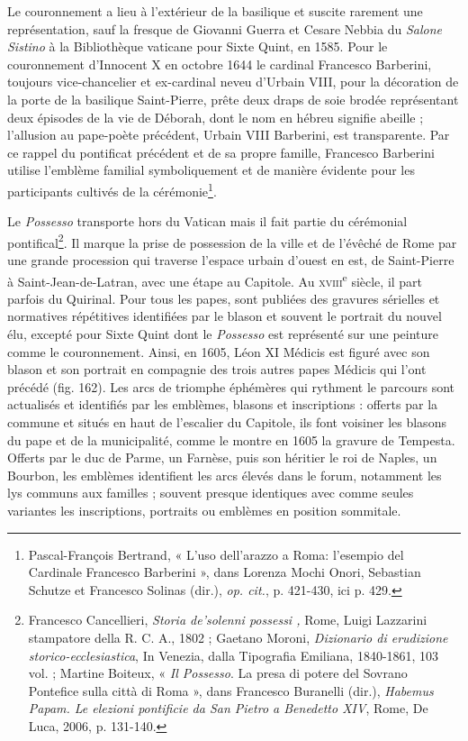 \documentclass[12pt,twoside,openany]{book}
\begin{document}
Le couronnement a lieu à l’extérieur de la basilique et suscite rarement une représentation, sauf la fresque de Giovanni Guerra et Cesare Nebbia du \textit{Salone Sistino} à la Bibliothèque vaticane pour Sixte Quint, en 1585. Pour le couronnement d’Innocent X en octobre 1644 le cardinal Francesco Barberini, toujours vice-chancelier et ex-cardinal neveu d’Urbain VIII, pour la décoration de la porte de la basilique Saint-Pierre, prête deux draps de soie brodée représentant deux épisodes de la vie de Déborah, dont le nom en hébreu signifie abeille ; l’allusion au pape-poète précédent, Urbain VIII Barberini, est transparente. Par ce rappel du pontificat précédent et de sa propre famille, Francesco Barberini utilise l’emblème familial symboliquement et de manière évidente pour les participants cultivés de la cérémonie\footnote{Pascal-François Bertrand, « L’uso dell’arazzo a Roma: l’esempio del Cardinale Francesco Barberini », dans Lorenza Mochi Onori, Sebastian Schutze et Francesco Solinas (dir.), \textit{op. cit.}, p. 421-430, ici p. 429.}.

Le \textit{Possesso} transporte hors du Vatican mais il fait partie du cérémonial pontifical\footnote{Francesco Cancellieri, \textit{Storia de'solenni possessi ,} Rome, Luigi Lazzarini stampatore della R. C. A., 1802 ; Gaetano Moroni, \textit{Dizionario di erudizione storico-ecclesiastica}, In Venezia, dalla Tipografia Emiliana, 1840-1861, 103 vol. ; Martine Boiteux, « \textit{Il Possesso}. La presa di potere del Sovrano Pontefice sulla città di Roma », dans Francesco Buranelli (dir.),\textit{ Habemus Papam. Le elezioni pontificie da San Pietro a Benedetto XIV}, Rome, De Luca, 2006, p. 131-140.}. Il marque la prise de possession de la ville et de l’évêché de Rome par une grande procession qui traverse l’espace urbain d’ouest en est, de Saint-Pierre à Saint-Jean-de-Latran, avec une étape au Capitole. Au \textsc{xviii}\textsuperscript{e} siècle, il part parfois du Quirinal. Pour tous les papes, sont publiées des gravures sérielles et normatives répétitives identifiées par le blason et souvent le portrait du nouvel élu, excepté pour Sixte Quint dont le \textit{Possesso} est représenté sur une peinture comme le couronnement. Ainsi, en 1605, Léon XI Médicis est figuré avec son blason et son portrait en compagnie des trois autres papes Médicis qui l’ont précédé (fig. 162). Les arcs de triomphe éphémères qui rythment le parcours sont actualisés et identifiés par les emblèmes, blasons et inscriptions : offerts par la commune et situés en haut de l’escalier du Capitole, ils font voisiner les blasons du pape et de la municipalité, comme le montre en 1605 la gravure de Tempesta. Offerts par le duc de Parme, un Farnèse, puis son héritier le roi de Naples, un Bourbon, les emblèmes identifient les arcs élevés dans le forum, notamment les lys communs aux familles ; souvent presque identiques avec comme seules variantes les inscriptions, portraits ou emblèmes en position sommitale.
\end{document}
